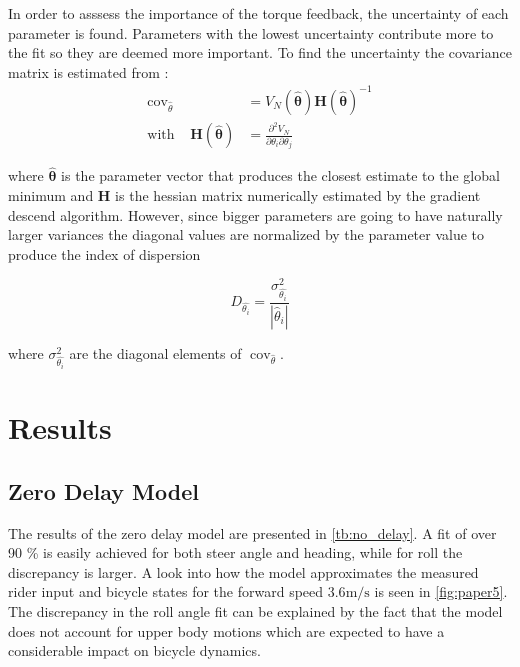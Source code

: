 In order to asssess the importance of the torque feedback, the uncertainty of each parameter is found. Parameters with the lowest uncertainty contribute more to the fit so they are deemed more important. To find the uncertainty the covariance matrix is estimated from :
\begin{align}
    \operatorname{cov}_{\hat{\theta}}  &=V_N(\boldsymbol{\hat{\theta}})\boldsymbol{H}(\boldsymbol{\hat{\theta}})^{-1}\\ \text{with} \;\;\;\;  \boldsymbol{H}(\boldsymbol{\hat{\theta}})&= \frac{\partial^{2} V_N}{\partial \theta_{i} \partial \theta_{j}}
\end{align}

where \ensuremath{\boldsymbol{\hat{\theta}}} is the parameter vector that produces the closest estimate to the global minimum and \ensuremath{\boldsymbol{H}} is the hessian matrix numerically estimated by the gradient descend algorithm.  However, since bigger parameters are going to have naturally larger variances the diagonal values are normalized by the parameter value to produce the index of dispersion

\begin{equation}
    D_{\hat{\theta_i}}=\frac{\sigma^{2}_{\hat{\theta_i}}}{|\hat{\theta}_i|}
    \end{equation}

    where \ensuremath{\sigma^{2}_{\hat{\theta_i}}} are the diagonal elements of \ensuremath{ \operatorname{cov}_{\hat{\theta}}}.


\section{Results}


\subsection{Zero Delay Model}
The results of the zero delay model are presented in \cref{tb:no_delay}. A fit of over 90 \% is easily achieved for both steer angle and heading, while for roll the discrepancy is larger. A  look into how the model approximates the measured rider input and bicycle states for the forward speed \ensuremath{3.6 \si{\meter\per\second}} is seen in \cref{fig:paper5}. The discrepancy in the roll angle fit can be explained by the fact that the model does not account for upper body motions which are expected to have a considerable impact on bicycle dynamics. 


